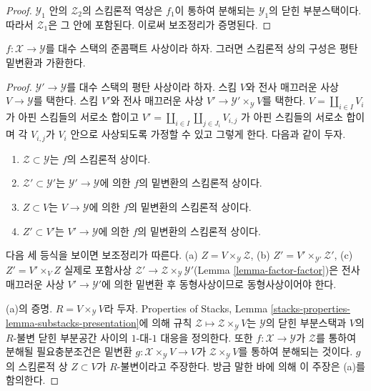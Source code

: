 \begin{proof}
$\mathcal{Y}_1$ 안의 $\mathcal{Z}_2$의 스킴론적 역상은 $f_1$이 통하여
분해되는 $\mathcal{Y}_1$의 닫힌 부분스택이다. 따라서
$\mathcal{Z}_1$은 그 안에 포함된다. 이로써 보조정리가 증명된다.
\end{proof}

\begin{lemma}
\label{lemma-existence-plus-flat-base-change}
$f : \mathcal{X} \to \mathcal{Y}$를 대수 스택의 준콤팩트 사상이라 하자.
그러면 스킴론적 상의 구성은 평탄 밑변환과 가환한다.
\end{lemma}

\begin{proof}
$\mathcal{Y}' \to \mathcal{Y}$를 대수 스택의 평탄 사상이라 하자. 스킴
$V$와 전사 매끄러운 사상 $V \to \mathcal{Y}$를 택한다. 스킴 $V'$와
전사 매끄러운 사상
$V' \to \mathcal{Y}' \times_\mathcal{Y} V$를 택한다.
$V = \coprod_{i \in I} V_i$가 아핀 스킴들의 서로소 합이고
$V' = \coprod_{i \in I} \coprod_{j \in J_i} V_{i, j}$
가 아핀 스킴들의 서로소 합이며 각 $V_{i, j}$가 $V_i$ 안으로 사상되도록
가정할 수 있고 그렇게 한다. 다음과 같이 두자.
\begin{enumerate}
\item $\mathcal{Z} \subset \mathcal{Y}$는 $f$의 스킴론적 상이다.
\item $\mathcal{Z}' \subset \mathcal{Y}'$는
$\mathcal{Y}' \to \mathcal{Y}$에 의한 $f$의 밑변환의 스킴론적 상이다.
\item $Z \subset V$는 $V \to \mathcal{Y}$에 의한 $f$의 밑변환의
스킴론적 상이다.
\item $Z' \subset V'$는 $V' \to \mathcal{Y}$에 의한 $f$의 밑변환의
스킴론적 상이다.
\end{enumerate}
다음 세 등식을 보이면 보조정리가 따른다.
(a) $Z = V \times_\mathcal{Y} \mathcal{Z}$,
(b) $Z' = V' \times_{\mathcal{Y}'} \mathcal{Z}'$,
(c) $Z' = V' \times_V Z$
실제로 포함사상
$\mathcal{Z}' \to \mathcal{Z} \times_\mathcal{Y} \mathcal{Y}'$(Lemma
\ref{lemma-factor-factor})은 전사 매끄러운 사상
$V' \to \mathcal{Y}'$에 의한 밑변환 후 동형사상이므로 동형사상이어야 한다.

\medskip\noindent
(a)의 증명. $R = V \times_\mathcal{Y} V$라 두자. Properties of Stacks,
Lemma \ref{stacks-properties-lemma-substacks-presentation}에 의해 규칙
$\mathcal{Z} \mapsto \mathcal{Z} \times_\mathcal{Y} V$는
$\mathcal{Y}$의 닫힌 부분스택과 $V$의 $R$-불변 닫힌 부분공간 사이의
$1$-대-$1$ 대응을 정의한다. 또한
$f : \mathcal{X} \to \mathcal{Y}$가 $\mathcal{Z}$를 통하여 분해될
필요충분조건은 밑변환
$g : \mathcal{X} \times_\mathcal{Y} V \to V$가
$\mathcal{Z} \times_\mathcal{Y} V$를 통하여 분해되는 것이다. $g$의
스킴론적 상 $Z \subset V$가 $R$-불변이라고 주장한다. 방금 말한 바에
의해 이 주장은 (a)를 함의한다.


\end{proof}
